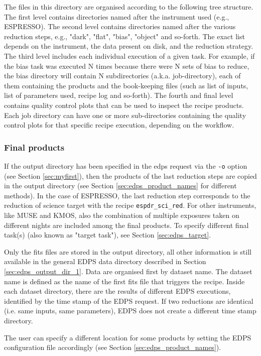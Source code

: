 The files in this directory are organised according to the following tree structure.
The first level contains directories named after the instrument used (e.g., ESPRESSO). The second level contains directories named after the various reduction steps, e.g., "dark", "flat", "bias", "object" and so-forth. The exact list depends on the instrument, the data present on disk, and the reduction strategy.
The third level includes each individual execution of a given task. For example, if the bias task was executed N times because there were N sets of bias to reduce, the bias directory will contain N subdirectories (a.k.a. job-directory), each of them containing the products and the book-keeping files (such as list of inputs, list of parameters used, recipe log and so-forth).
The fourth and final level contains quality control plots that can be used to inspect the recipe products. Each job directory can have one or more sub-directories containing the quality control plots for that specific recipe execution, depending on the workflow.

\subsubsection{Final products}
\label{sec:edps_output_dir_2}

If the output directory has been specified in the edps request via the {\tt -o} option (see Section \ref{sec:myfirst}), then the products of the last reduction steps are copied in the output directory (see Section \ref{sec:edps_product_names} for different methods).  In the case of ESPRESSO, the last reduction step corresponds to the reduction of science target with the recipe {\tt espdr\_sci\_red}. For other instruments, like MUSE and KMOS, also the combination of multiple exposures taken on different nights are included among the final products. To specify different final task(s) (also known as "target task"), see Section \ref{sec:edps_target}. 

 
Only the fits files are stored in the output directory, all other information is still available in the general EDPS data directory described in Section \ref{sec:edps_output_dir_1}.
Data are organised first by dataset name. The dataset name is defined as the name of the first fits file that triggers the recipe. Inside each dataset directory, there are the results of different EDPS executions, identified by the time stamp of the EDPS request. If two reductions are identical (i.e. same inputs, same parameters), EDPS does not create a different time stamp directory.


The user can specify a different location for some products by setting the EDPS configuration file accordingly (see Section \ref{sec:edps_product_names}).

